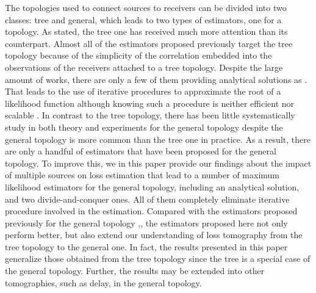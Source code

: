 \documentclass[10pt,twocolumn]{IEEEtran}
\begin{document}
The topologies used to connect sources to receivers can be divided
into two classes: tree and general, which leads to two types of
estimators, one for a topology. As stated, the tree one has received
much more attention than its counterpart. Almost all of the estimators
proposed previously target the tree topology because of the simplicity
of the correlation embedded into the observations of the receivers
attached to a tree topology.  Despite the large amount of works, there
are only a few of them providing analytical solutions as \cite{CDHT99}
\cite{DHPT06} \cite{Zhu06-2}. That leads to the use of iterative
procedures to approximate the root of a likelihood function although
knowing such a  procedure is neither efficient nor scalable
\cite{DLR77}. In contrast to the tree topology, there has been little
systematically study in both theory and experiments for the general
topology despite the general topology is more common than the tree one
in practice. As a result, there are only  a handful of estimators that
have been proposed for the general topology. To improve this, we in
this paper provide our findings about the impact of multiple sources
on loss estimation that lead to a number of maximum likelihood
estimators for the general topology, including an analytical solution,
and two divide-and-conquer ones. All of them completely eliminate
iterative procedure involved in the estimation. Compared with the
estimators proposed previously for the general topology
\cite{CDHT99},\cite{BDPT}, the estimators proposed here not only
perform better, but also extend our understanding of loss tomography
from the tree topology to the general one.  In fact, the results
presented in this paper generalize those obtained from the tree
topology since the tree is a special case of the general topology.
Further, the results may be extended into other tomographies, such as
delay, in the general topology.
\end{document}
